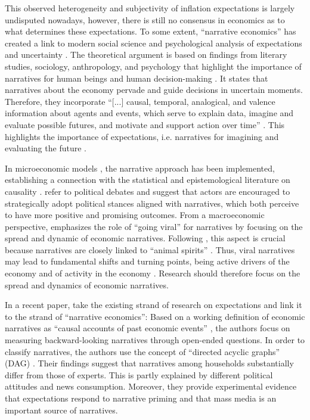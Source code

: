 This observed heterogeneity and subjectivity of inflation expectations is largely undisputed nowadays, however, there is still no consensus in economics as to what determines these expectations. To some extent, ``narrative economics'' \citep{Shiller.2017,Shiller.2019} has created a link to modern social science and psychological analysis of expectations and uncertainty \citep{Beckert.2016, Bronk.2018, Tuckett.2017}. The theoretical argument is based on findings from literary studies, sociology, anthropology, and psychology that highlight the importance of narratives for human beings and human decision-making \citep{Shiller.2017}. It states that narratives about the economy pervade and guide decisions in uncertain moments. Therefore, they incorporate ``[...] causal, temporal, analogical, and valence information about agents and events, which serve to explain data, imagine and evaluate possible futures, and motivate and support action over time'' \citep{Johnson.2023}. This highlights the importance of expectations, i.e. narratives for imagining and evaluating the future \citep{Johnson.2023, Bronk.2018}.

In microeconomic models \citep{Eliaz.2020, Eliaz.2022}, the narrative approach has been implemented, establishing a connection with the statistical and epistemological literature on causality \citep{Pearl.2009}. \cite{Eliaz.2020} refer to political debates and suggest that actors are encouraged to strategically adopt political stances aligned with narratives, which both perceive to have more positive and promising outcomes. From a macroeconomic perspective, \cite{Shiller.2017,Shiller.2019} emphasizes the  role of ``going viral'' for narratives by focusing on the spread and dynamic of economic narratives. Following \cite{Shiller.2019}, this aspect is crucial because narratives are closely linked to ``animal spirits'' \citep[17]{Shiller.2009}. Thus, viral narratives may lead to fundamental shifts and turning points, being active drivers of the economy and of activity in the economy \citep{reccius.2024}. Research should therefore focus on the spread and dynamics of economic narratives.


In a recent paper, \cite{Andre.2023} take the existing strand of research on expectations and link it to the strand of ``narrative economics'': Based on a working definition of economic narratives as ``causal accounts of past economic events'' \citep[5]{Andre.2023}, the authors focus on measuring backward-looking narratives through open-ended questions. In order to classify narratives, the authors use the concept of ``directed acyclic graphs'' (DAG) \citep{Pearl.2009}. Their findings suggest that narratives among households substantially differ from those of experts. This is partly explained by different political attitudes and news consumption. Moreover, they provide experimental evidence that expectations respond to narrative priming and that mass media is an important source of narratives.

